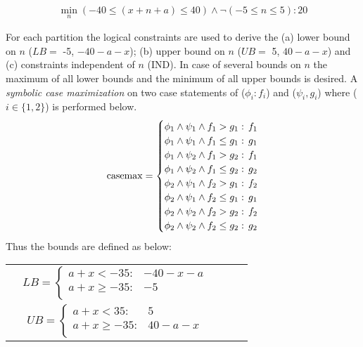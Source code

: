 \begin{itemize}
\begin{align}
\min_n (-40 \leq (x+n+a) \leq 40) \land \neg(-5 \leq n \leq 5) :  20\nonumber
\end{align} 

For each partition the logical constraints are used to derive the (a) lower bound on $n$ ($LB =$ -5, $- 40 - a -x$); (b) upper bound on $n$ ($UB =$ 5, $40 - a-x$)  and (c) constraints independent of $n$ (IND). In case of several bounds on $n$ the maximum of all lower bounds and the minimum of all upper bounds is desired. A \emph{symbolic case maximization} on two case statements of ($\phi_i:f_i$) and ($\psi_i,g_i$) where ($i \in \lbrace 1,2\rbrace$) is performed below.
{\footnotesize
\begin{align}
\casemax =
 \begin{cases}
  \phi_1 \wedge \psi_1 \wedge f_1 > g_1    : & \hspace{-2mm} f_1 \\ 
  \phi_1 \wedge \psi_1 \wedge f_1 \leq g_1 : & \hspace{-2mm} g_1 \\ 
  \phi_1 \wedge \psi_2 \wedge f_1 > g_2    : & \hspace{-2mm}f_1 \\ 
  \phi_1 \wedge \psi_2 \wedge f_1 \leq g_2 : & \hspace{-2mm} g_2 \\ 
 \phi_2 \wedge \psi_1 \wedge f_2 > g_1    : & \hspace{-2mm} f_2 \\ 
 \phi_2 \wedge \psi_1 \wedge f_2 \leq g_1 : & \hspace{-2mm} g_1 \\ 
 \phi_2 \wedge \psi_2 \wedge f_2 > g_2    : & \hspace{-2mm} f_2 \\ 
 \phi_2 \wedge \psi_2 \wedge f_2 \leq g_2 : & \hspace{-2mm} g_2 \\ 
  \end{cases} \nonumber
\end{align}
}
Thus the bounds are defined as below: 

\begin{center}
\begin{tabular}{r c c c l}
&
$
LB =  
\begin{cases}
 a + x < -35 : & -40 - x -a \\ 
 a + x \geq -35 : & -5 \\ 
\end{cases} 
$
\\
&
$ UB =  
\begin{cases}
 a + x < 35 : & 5 \\ 
 a + x \geq -35 : & 40 -a-x \\ 
\end{cases} 
$
\end{tabular}
\end{center}


\end{itemize}
